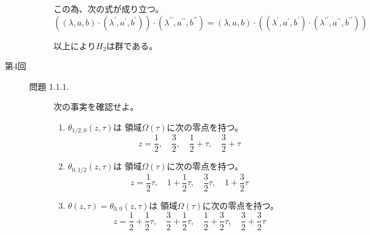 \documentclass[12pt,b5paper]{ltjsarticle}
\begin{document}
\begin{description}
\begin{description}
             この為、次の式が成り立つ。
             \begin{equation}
              \left( (\lambda,a,b)\cdot (\lambda^{\prime},a^{\prime},b^{\prime})\right) \cdot (\lambda^{\prime\prime},a^{\prime\prime},b^{\prime\prime})
               =
               (\lambda,a,b)\cdot \left( (\lambda^{\prime},a^{\prime},b^{\prime}) \cdot (\lambda^{\prime\prime},a^{\prime\prime},b^{\prime\prime})\right)
             \end{equation}

             以上により$H_{2}$は群である。

\hrulefill

 \end{description}

 \item[第4回]
 \begin{description}
  \item[問題 1.1.1.]
             次の事実を確認せよ。
             \begin{enumerate}
              \item
                   $\theta_{1/2,0}(z,\tau)$は
                   領域$\Omega(\tau)$に次の零点を持つ。
                   \begin{equation}
                    z=\frac{1}{2},\quad
                     \frac{3}{2},\quad
                     \frac{1}{2}+\tau,\quad
                     \frac{3}{2}+\tau
                   \end{equation}

              \item
                   $\theta_{0,1/2}(z,\tau)$は
                   領域$\Omega(\tau)$に次の零点を持つ。
                   \begin{equation}
                    z=\frac{1}{2}\tau,\quad
                     1+\frac{1}{2}\tau,\quad
                     \frac{3}{2}\tau,\quad
                     1+\frac{3}{2}\tau
                   \end{equation}

              \item
                   $\theta(z,\tau)=\theta_{0,0}(z,\tau)$は
                   領域$\Omega(\tau)$に次の零点を持つ。
                   \begin{equation}
                    z=\frac{1}{2}+\frac{1}{2}\tau,\quad
                     \frac{3}{2}+\frac{1}{2}\tau,\quad
                     \frac{1}{2}+\frac{3}{2}\tau,\quad
                     \frac{3}{2}+\frac{3}{2}\tau
                   \end{equation}
             \end{enumerate}


\end{description}
\end{description}
\end{document}
